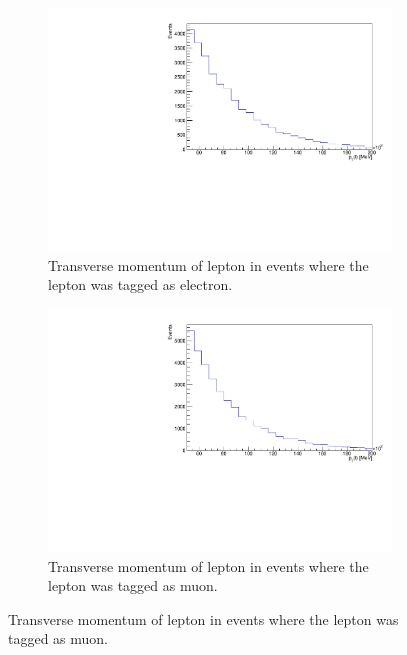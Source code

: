 \begin{figure}[H]%
  \begin{subfigure}{0.48\textwidth}%
    \centering%
    \includegraphics[width=\textwidth]{plots/ttbar_distributions/ttbar.el_lep_pt.pdf}%
    \caption{Transverse momentum of lepton in events where the lepton was tagged as electron.}%
    \label{fig:2a}%
  \end{subfigure}%
  \hfill
  \begin{subfigure}{0.48\textwidth}%
    \centering%
    \includegraphics[width=\textwidth]{plots/ttbar_distributions/ttbar.mu_lep_pt.pdf}%
    \caption{Transverse momentum of lepton in events where the lepton was tagged as muon.}%
    \label{fig:2b}%
  \end{subfigure}%


\end{figure}
